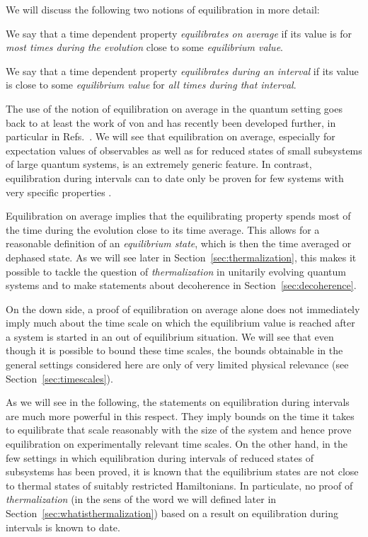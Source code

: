 \documentclass[a4paper,12pt,listof=totoc,index=totoc,bibliography=totoc,headsepline=false,headings=normal,BCOR16.153846mm,DIV12,headinclude,twoside,cleardoublepage=empty,numbers=noenddot,final]{scrreprt}
\theoremstyle{mystyle}
\numberwithin{equation}{section}
\numberwithin{figure}{section}
\numberwithin{lemma}{section}
\numberwithin{theorem}{section}
\numberwithin{corollary}{section}
\numberwithin{definition}{section}
\numberwithin{conjecture}{section}
\numberwithin{observation}{section}
\newcommand{\+}{\mkern2mu}
\DeclareMathOperator{\1}{\mathds{1}}
\begin{document}
We will discuss the following two notions of equilibration in more detail:
\begin{description}[font=\normalfont\itshape]
\item[Equilibration on average:]
  We say that a time dependent property \emph{equilibrates on average} if its value is for \emph{most times during the evolution} close to some \emph{equilibrium value}.
\item[Equilibration during intervals:]
We say that a time dependent property \emph{equilibrates during an interval} if its value is close to some \emph{equilibrium value} for \emph{all times during that interval}. 
\end{description}

The use of the notion of equilibration on average in the quantum setting goes back to at least the work of von \textcite{vonneumann1929} and has recently been developed further, in particular in Refs.~\cite{tasaki98,Reimann08,Linden09,1110.5759v1,1012.4622v1,Reimann2012,Reimann12}.
We will see that equilibration on average, especially for expectation values of observables as well as for reduced states of small subsystems of large quantum systems, is an extremely generic feature.
In contrast, equilibration during intervals can to date only be proven for few systems with very specific properties \cite{cramer10_1,PhysRevLett.10-5}.

Equilibration on average implies that the equilibrating property spends most of the time during the evolution close to its time average.
This allows for a reasonable definition of an \emph{equilibrium state}, which is then the time averaged or dephased state.
As we will see later in Section~\ref{sec:thermalization}, this makes it possible to tackle the question of \emph{thermalization} in unitarily evolving quantum systems and to make statements about decoherence in Section~\ref{sec:decoherence}.

On the down side, a proof of equilibration on average alone does not immediately imply much about the time scale on which the equilibrium value is reached after a system is started in an out of equilibrium situation.
We will see that even though it is possible to bound these time scales, the bounds obtainable in the general settings considered here are only of very limited physical relevance (see Section~\ref{sec:timescales}).

As we will see in the following, the statements on equilibration during intervals are much more powerful in this respect.
They imply bounds on the time it takes to equilibrate that scale reasonably with the size of the system and hence prove equilibration on experimentally relevant time scales.
On the other hand, in the few settings in which equilibration during intervals of reduced states of subsystems has been proved, it is known that the equilibrium states are not close to thermal states of suitably restricted Hamiltonians.
In particulate, no proof of \emph{thermalization} (in the sens of the word we will defined later in Section~\ref{sec:whatisthermalization}) based on a result on equilibration during intervals is known to date.
\end{document}
